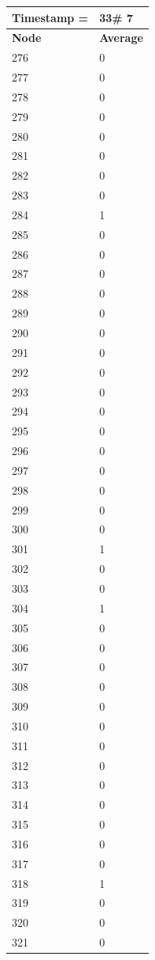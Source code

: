 \begin{tabular}{|l||l|}
\hline
\textbf{Timestamp =} & \textbf{33}\# 7\\\hline
	\textbf{Node} & \textbf{Average} \\ \hline
\hline
	276 & 0 \\ \hline
	277 & 0 \\ \hline
	278 & 0 \\ \hline
	279 & 0 \\ \hline
	280 & 0 \\ \hline
	281 & 0 \\ \hline
	282 & 0 \\ \hline
	283 & 0 \\ \hline
	284 & 1 \\ \hline
	285 & 0 \\ \hline
	286 & 0 \\ \hline
	287 & 0 \\ \hline
	288 & 0 \\ \hline
	289 & 0 \\ \hline
	290 & 0 \\ \hline
	291 & 0 \\ \hline
	292 & 0 \\ \hline
	293 & 0 \\ \hline
	294 & 0 \\ \hline
	295 & 0 \\ \hline
	296 & 0 \\ \hline
	297 & 0 \\ \hline
	298 & 0 \\ \hline
	299 & 0 \\ \hline
	300 & 0 \\ \hline
	301 & 1 \\ \hline
	302 & 0 \\ \hline
	303 & 0 \\ \hline
	304 & 1 \\ \hline
	305 & 0 \\ \hline
	306 & 0 \\ \hline
	307 & 0 \\ \hline
	308 & 0 \\ \hline
	309 & 0 \\ \hline
	310 & 0 \\ \hline
	311 & 0 \\ \hline
	312 & 0 \\ \hline
	313 & 0 \\ \hline
	314 & 0 \\ \hline
	315 & 0 \\ \hline
	316 & 0 \\ \hline
	317 & 0 \\ \hline
	318 & 1 \\ \hline
	319 & 0 \\ \hline
	320 & 0 \\ \hline
	321 & 0 \\ \hline
\end{tabular}
